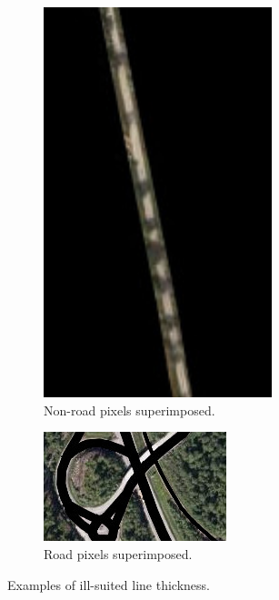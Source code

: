 \begin{figure}
\begin{subfigure}{0.28\textwidth}
\includegraphics[width=0.73\textwidth]{figs/illsuited_label.jpg}
\caption{Non-road pixels superimposed.} \label{fig:ill-suited_example1}
\vspace{0.5cm} %
\end{subfigure}
\hspace*{\fill} %
\begin{subfigure}{0.58\textwidth}
\includegraphics[width=\textwidth]{figs/illsuited_label2.jpg}
\caption{Road pixels superimposed.} \label{fig:ill-suited_example2}
\vspace{0.9cm} %
\end{subfigure}

\caption[Examples of ill-suited line thickness]{Examples of ill-suited line thickness.} \label{fig:ill-suited}
\end{figure}
